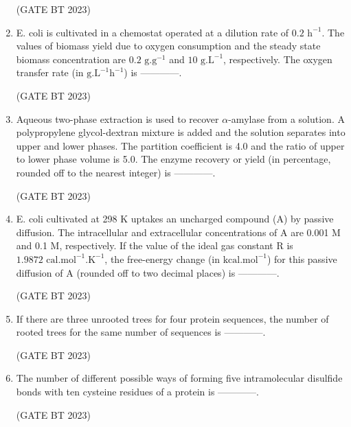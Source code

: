 \documentclass[journal,12pt,onecolumn]{IEEEtran}
\begin{document}
\begin{enumerate}
    \hfill(GATE BT 2023)

    \item E. coli is cultivated in a chemostat operated at a dilution rate of $0.2 \text{ h}^{-1}$. The values of biomass yield due to oxygen consumption and the steady state biomass concentration are $0.2 \text{ g.g}^{-1}$ and $10 \text{ g.L}^{-1}$, respectively. The oxygen transfer rate (in $\text{g.L}^{-1}\text{h}^{-1}$) is ------------.

    \hfill(GATE BT 2023)

    \item Aqueous two-phase extraction is used to recover $\alpha$-amylase from a solution. A polypropylene glycol-dextran mixture is added and the solution separates into upper and lower phases. The partition coefficient is 4.0 and the ratio of upper to lower phase volume is 5.0. The enzyme recovery or yield (in percentage, rounded off to the nearest integer) is ------------.

    \hfill(GATE BT 2023)

    \item E. coli cultivated at 298 K uptakes an uncharged compound (A) by passive diffusion. The intracellular and extracellular concentrations of A are 0.001 M and 0.1 M, respectively. If the value of the ideal gas constant R is $1.9872 \text{ cal.mol}^{-1}.\text{K}^{-1}$, the free-energy change (in $\text{kcal.mol}^{-1}$) for this passive diffusion of A (rounded off to two decimal places) is ------------.

    \hfill(GATE BT 2023)

    \item If there are three unrooted trees for four protein sequences, the number of rooted trees for the same number of sequences is ------------.

    \hfill(GATE BT 2023)

    \item The number of different possible ways of forming five intramolecular disulfide bonds with ten cysteine residues of a protein is ------------.

    \hfill(GATE BT 2023)


\end{enumerate}
\end{document}
